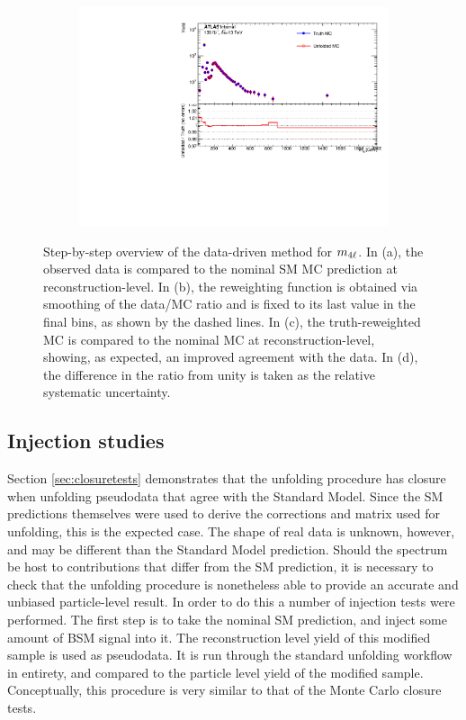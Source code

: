 \begin{figure}[htb!]
\begin{subfigure}{.49\textwidth}
    \end{subfigure}
    \begin{subfigure}{.49\textwidth}\centering
      \includegraphics[width=.99\linewidth]{Figures/m4l/DataDriven/UnfoldedM4l.pdf}  
    \end{subfigure}
    \caption{Step-by-step overview of the data-driven method for $m_{4\ell}$. In (a), the observed data is compared to the nominal SM MC prediction at reconstruction-level. In (b), the reweighting function is obtained via smoothing of the data/MC ratio and is fixed to its last value in the final bins, as shown by the dashed lines. In (c), the truth-reweighted MC is compared to the nominal MC at reconstruction-level, showing, as expected, an improved agreement with the data. In (d), the difference in the ratio from unity is taken as the relative systematic uncertainty. \label{fig:m4ldatadriven}}
\end{figure}

\subsection{Injection studies}
\label{ssec:injectiontests}
Section \ref{sec:closuretests} demonstrates that the unfolding procedure has closure when unfolding pseudodata that agree with the Standard Model. Since the SM predictions themselves were used to derive the corrections and matrix used for unfolding, this is the expected case. The shape of real data is unknown, however, and may be different than the Standard Model prediction. Should the \mFourL spectrum be host to contributions that differ from the SM prediction, it is necessary to check that the unfolding procedure is nonetheless able to provide an accurate and unbiased particle-level result. In order to do this a number of injection tests were performed. The first step is to take the nominal SM prediction, and inject some amount of BSM signal into it. The reconstruction level yield of this modified sample is used as pseudodata. It is run through the standard unfolding workflow in entirety, and compared to the particle level yield of the modified sample. Conceptually, this procedure is very similar to that of the Monte Carlo closure tests. 

